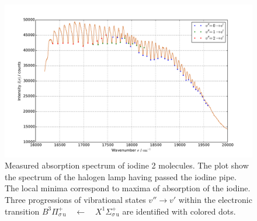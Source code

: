 \begin{figure}
    \centering
    \includegraphics[width=\pltw]{analysis/figures/absorp_03.pdf}
    \caption{Measured absorption spectrum of iodine 2 molecules. The plot show the spectrum of 
    the halogen lamp having passed the iodine pipe. The local minima correspond to maxima of 
    absorption of the iodine. Three progressions of vibrational states $v'' \rightarrow v'$
    within the electronic transition 
    $B ^3\Pi_{\sigma \, \mathrm{u}}^{+} \quad \leftarrow \quad X ^1\Sigma_{\sigma \, \mathrm{u}}^{+}$ 
    are identified with colored dots. }
    \label{fig:absorp}
\end{figure}

